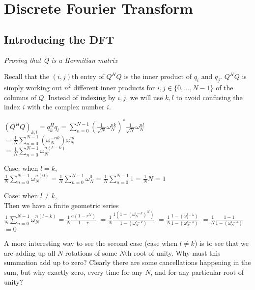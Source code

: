 \chapter{Discrete Fourier Transform}



\section{Introducing the DFT}





\frmrule 

\textit{Proving that Q is a Hermitian matrix}


Recall that the $(i,j)$th entry of $Q^{H}Q$ is 
the inner product of $q_i$ and $q_j$. $Q^{H}Q$ is 
simply working out $n^2$ different inner products 
for $i,j \in \{0,...,N-1\}$ of the columns of $Q$. 
Instead of indexing by $i,j$, we will use $k,l$ 
to avoid confusing the index $i$ with the complex 
number $i$. 

$(Q^{H}Q)_{k,l} = q^H_k q_l = \sum^{N-1}_{n = 0} (\frac{1}{\sqrt{N}} \omega^{nk}_N)^{*} \frac{1}{\sqrt{N}} \omega^{nl}_N$\\
$= \frac{1}{N} \sum^{N-1}_{n = 0} (\omega^{-nk}_N) \omega^{nl}_N$ \\
$= \frac{1}{N} \sum^{N-1}_{n = 0} \omega^{n(l-k)}_N $

Case: when $l=k$, \\
$ \frac{1}{N} \sum^{N-1}_{n = 0} \omega^{n(0)}_N =  \frac{1}{N} \sum^{N-1}_{n = 0} \omega^{0}_N 
=  \frac{1}{N} \sum^{N-1}_{n = 0} 1 =  \frac{1}{N} N = 1$

Case: when $l\neq k$, \\
Then we have a finite geometric series\\
$ \frac{1}{N} \sum^{N-1}_{n = 0} \omega^{n(l-k)}_N =  \frac{1}{N} \frac{a(1-r^{N})}{1-r}$
$ = \frac{1}{N} \frac{1(1-(\omega^{l-k}_{N})^{N})}{1-(\omega^{l-k}_{N})}$
$ = \frac{1}{N} \frac{1-(\omega^{l-k}_{1})}{1-(\omega^{l-k}_{N})}$
$ = \frac{1}{N} \frac{1-1}{1-(\omega^{l-k}_{N})}$
$ = 0$


A more interesting way to see the second case (case when $l\neq k$) is to see that
we are adding up all $N$ rotations of some $N$th root of unity. 
Why must this summation add up to zero? Clearly there are some cancellations
happening in the sum, but why exactly zero, every time for any $N$, and for any 
particular root of unity?


\frmrule 

